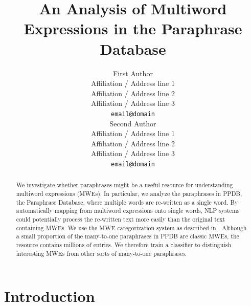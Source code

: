 \documentclass[11pt]{article}
\title{An Analysis of Multiword Expressions in the Paraphrase Database}
\author{First Author \\
  Affiliation / Address line 1 \\
  Affiliation / Address line 2 \\
  Affiliation / Address line 3 \\
  {\tt email@domain} \\\And
  Second Author \\
  Affiliation / Address line 1 \\
  Affiliation / Address line 2 \\
  Affiliation / Address line 3 \\
  {\tt email@domain} \\}
\date{}
\begin{document}
\maketitle
\begin{abstract}
We investigate whether paraphrases might be a useful resource for understanding multiword expressions (MWEs).  In particular, we analyze the paraphrases in PPDB, the Paraphrase Database, where multiple words are re-written as a single word.  By automatically mapping from multiword expressions onto single words, NLP systems could potentially process the re-written text more easily than the original text containing MWEs. We use the MWE categorization system as described in .  Although a small proportion of the many-to-one paraphrases in PPDB are classic MWEs, the resource contains millions of entries.  We therefore train a classifier to distinguish interesting MWEs from other sorts of many-to-one paraphrases.
\end{abstract}

\section{Introduction}
\label{intro}

%
% 
\end{document}
